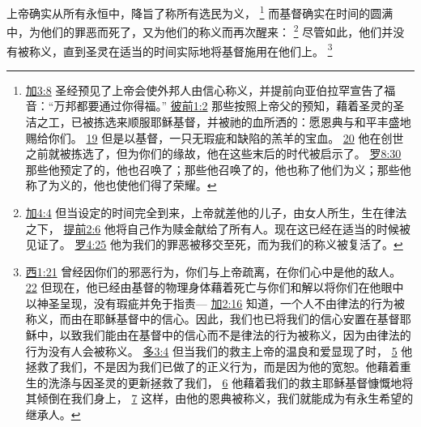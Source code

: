 \documentclass[12pt, a4paper, oneside]{ctexart}
\newcounter{parnum}[section]
\newcommand{\N}{%
   \noindent\refstepcounter{parnum}%
    \makebox[\parindent][l]{\textbf{\arabic{parnum}.}}}
\begin{document}
\N 上帝确实从所有永恒中，降旨了称所有选民为义，
	\footnote {
		\href{https://biblehub.com/galatians/3-8.htm}{加3:8} 圣经预见了上帝会使外邦人由信心称义，并提前向亚伯拉罕宣告了福音：“万邦都要通过你得福。”
		\href{https://biblehub.com/1_peter/1-2.htm}{彼前1:2} 那些按照上帝父的预知，藉着圣灵的圣洁之工，已被拣选来顺服耶稣基督，并被祂的血所洒的：愿恩典与和平丰盛地赐给你们。
		\href{https://biblehub.com/1_peter/1-19.htm}{19} 但是以基督，一只无瑕疵和缺陷的羔羊的宝血。
		\href{https://biblehub.com/1_peter/1-20.htm}{20} 他在创世之前就被拣选了，但为你们的缘故，他在这些末后的时代被启示了。
		\href{https://biblehub.com/romans/8-30.htm}{罗8:30} 那些他预定了的，他也召唤了；那些他召唤了的，他也称了他们为义；那些他称了为义的，他也使他们得了荣耀。
	}
	而基督确实在时间的圆满中，为他们的罪恶而死了，又为他们的称义而再次醒来：
	\footnote {
		\href{https://biblehub.com/galatians/4-4.htm}{加4:4} 但当设定的时间完全到来，上帝就差他的儿子，由女人所生，生在律法之下，
		\href{https://biblehub.com/1_timothy/2-6.htm}{提前2:6} 他将自己作为赎金献给了所有人。现在这已经在适当的时候被见证了。
		\href{https://biblehub.com/romans/4-25.htm}{罗4:25} 他为我们的罪恶被移交至死，而为我们的称义被复活了。
	}
	尽管如此，他们并没有被称义，直到圣灵在适当的时间实际地将基督施用在他们上。
	\footnote {
		\href{https://biblehub.com/colossians/1-21.htm}{西1:21} 曾经因你们的邪恶行为，你们与上帝疏离，在你们心中是他的敌人。
		\href{https://biblehub.com/colossians/1-22.htm}{22} 但现在，他已经由基督的物理身体藉着死亡与你们和解以将你们在他眼中以神圣呈现，没有瑕疵并免于指责---
		\href{https://biblehub.com/galatians/2-16.htm}{加2:16} 知道，一个人不由律法的行为被称义，而由在耶稣基督中的信心。因此，我们也已将我们的信心安置在基督耶稣中，以致我们能由在基督中的信心而不是律法的行为被称义，因为由律法的行为没有人会被称义。
		\href{https://biblehub.com/titus/3-4.htm}{多3:4} 但当我们的救主上帝的温良和爱显现了时，
		\href{https://biblehub.com/titus/3-5.htm}{5} 他拯救了我们，不是因为我们已做了的正义行为，而是因为他的宽恕。他藉着重生的洗涤与因圣灵的更新拯救了我们，
		\href{https://biblehub.com/titus/3-6.htm}{6} 他藉着我们的救主耶稣基督慷慨地将其倾倒在我们身上，
		\href{https://biblehub.com/titus/3-7.htm}{7} 这样，由他的恩典被称义，我们就能成为有永生希望的继承人。
	}
\end{document}
